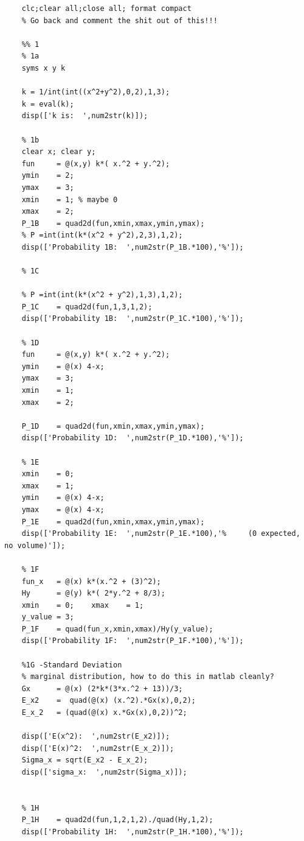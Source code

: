 \documentclass[]{article}
\begin{document}
\begin{lstlisting}
	clc;clear all;close all; format compact
	% Go back and comment the shit out of this!!!
	
	%% 1
	% 1a
	syms x y k
	
	k = 1/int(int((x^2+y^2),0,2),1,3);
	k = eval(k);
	disp(['k is:  ',num2str(k)]);
	
	% 1b
	clear x; clear y; 
	fun     = @(x,y) k*( x.^2 + y.^2);
	ymin    = 2;
	ymax    = 3;
	xmin    = 1; % maybe 0
	xmax    = 2;
	P_1B    = quad2d(fun,xmin,xmax,ymin,ymax);
	% P =int(int(k*(x^2 + y^2),2,3),1,2);
	disp(['Probability 1B:  ',num2str(P_1B.*100),'%']);
	
	% 1C
	
	% P =int(int(k*(x^2 + y^2),1,3),1,2);
	P_1C    = quad2d(fun,1,3,1,2);
	disp(['Probability 1B:  ',num2str(P_1C.*100),'%']);
	
	% 1D
	fun     = @(x,y) k*( x.^2 + y.^2);
	ymin    = @(x) 4-x;
	ymax    = 3;
	xmin    = 1; 
	xmax    = 2;
	
	P_1D    = quad2d(fun,xmin,xmax,ymin,ymax);
	disp(['Probability 1D:  ',num2str(P_1D.*100),'%']);
	
	% 1E
	xmin    = 0;
	xmax    = 1;
	ymin    = @(x) 4-x;
	ymax    = @(x) 4-x;
	P_1E    = quad2d(fun,xmin,xmax,ymin,ymax);
	disp(['Probability 1E:  ',num2str(P_1E.*100),'%     (0 expected, no volume)']);
	
	% 1F
	fun_x   = @(x) k*(x.^2 + (3)^2);
	Hy      = @(y) k*( 2*y.^2 + 8/3);
	xmin    = 0;    xmax    = 1;
	y_value = 3;
	P_1F    = quad(fun_x,xmin,xmax)/Hy(y_value);
	disp(['Probability 1F:  ',num2str(P_1F.*100),'%']);
	
	%1G -Standard Deviation
	% marginal distribution, how to do this in matlab cleanly?
	Gx      = @(x) (2*k*(3*x.^2 + 13))/3;
	E_x2    =  quad(@(x) (x.^2).*Gx(x),0,2);
	E_x_2   = (quad(@(x) x.*Gx(x),0,2))^2;
	
	disp(['E(x^2):  ',num2str(E_x2)]);
	disp(['E(x)^2:  ',num2str(E_x_2)]);
	Sigma_x = sqrt(E_x2 - E_x_2);
	disp(['sigma_x:  ',num2str(Sigma_x)]);
	
	
	% 1H
	P_1H    = quad2d(fun,1,2,1,2)./quad(Hy,1,2);
	disp(['Probability 1H:  ',num2str(P_1H.*100),'%']);
\end{lstlisting}
\end{document}
